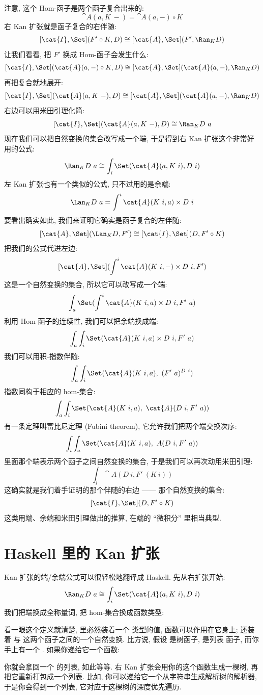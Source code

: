 \noindent
注意, 这个 Hom-函子是两个函子复合出来的:
\[\cat{A}(a, K\ -) = \cat{A}(a, -) \circ K\]
右 Kan 扩张就是函子复合的右伴随:
\[[\cat{I}, \Set](F' \circ K, D) \cong [\cat{A}, \Set](F', \Ran_{K}D)\]
让我们看看, 把 $F'$ 换成 Hom-函子会发生什么:
\[[\cat{I}, \Set](\cat{A}(a, -) \circ K, D) \cong [\cat{A}, \Set](\cat{A}(a, -), \Ran_{K}D)\]
再把复合就地展开:
\[[\cat{I}, \Set](\cat{A}(a, K\ -), D) \cong [\cat{A}, \Set](\cat{A}(a, -), \Ran_{K}D)\]
右边可以用米田引理化简:
\[[\cat{I}, \Set](\cat{A}(a, K\ -), D) \cong \Ran_{K}D\ a\]
现在我们可以把自然变换的集合改写成一个端, 于是得到右 Kan 扩张这个非常好用的公式:
\[\Ran_{K}D\ a \cong \int_i \Set(\cat{A}(a, K\ i), D\ i)\]
左 Kan 扩张也有一个类似的公式, 只不过用的是余端:
\[\Lan_{K}D\ a = \int^i \cat{A}(K\ i, a)\times{}D\ i\]
要看出确实如此, 我们来证明它确实是函子复合的左伴随:
\[[\cat{A}, \Set](\Lan_{K}D, F') \cong [\cat{I}, \Set](D, F' \circ K)\]
把我们的公式代进左边:
\[[\cat{A}, \Set](\int^i \cat{A}(K\ i, -)\times{}D\ i, F')\]
这是一个自然变换的集合, 所以它可以改写成一个端:
\[\int_a \Set(\int^i \cat{A}(K\ i, a)\times{}D\ i, F'\ a)\]
利用 Hom-函子的连续性, 我们可以把余端换成端:
\[\int_a \int_i \Set(\cat{A}(K\ i, a)\times{}D\ i, F'\ a)\]
我们可以用积-指数伴随:
\[\int_a \int_i \Set(\cat{A}(K\ i, a),\ (F'\ a)^{D\ i})\]
指数同构于相应的 hom-集合:
\[\int_a \int_i \Set(\cat{A}(K\ i, a),\ \cat{A}(D\ i, F'\ a))\]
有一条定理叫富比尼定理 (Fubini theorem), 它允许我们把两个端交换次序:
\[\int_i \int_a \Set(\cat{A}(K\ i, a),\ A(D\ i, F'\ a))\]
里面那个端表示两个函子之间自然变换的集合, 于是我们可以再次动用米田引理:
\[\int_i \cat{A}(D\ i, F'\ (K\ i))\]
这确实就是我们着手证明的那个伴随的右边 —— 那个自然变换的集合:
\[[\cat{I}, \Set](D, F' \circ K)\]
这类用端、余端和米田引理做出的推算, 在端的 ``微积分'' 里相当典型.

\section{Haskell 里的 Kan 扩张}

Kan 扩张的端/余端公式可以很轻松地翻译成 Haskell. 先从右扩张开始:
\[\Ran_{K}D\ a \cong \int_i \Set(\cat{A}(a, K\ i), D\ i)\]
我们把端换成全称量词, 把 hom-集合换成函数类型:

看一眼这个定义就清楚,  里必然装着一个  类型的值, 函数可以作用在它身上; 还装着
 与  这两个函子之间的一个自然变换. 比方说, 假设  是树函子,  是列表
函子, 而你手上有一个 . 如果你递给它一个函数:

你就会拿回一个  的列表, 如此等等. 右 Kan 扩张会用你的这个函数生成一棵树,
再把它重新打包成一个列表. 比如, 你可以递给它一个从字符串生成解析树的解析器,
于是你会得到一个列表, 它对应于这棵树的深度优先遍历.

